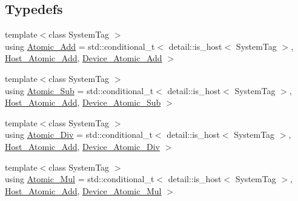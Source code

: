 \subsection*{Typedefs}
\begin{DoxyCompactItemize}
\item 
{\footnotesize template$<$class System\+Tag $>$ }\\using \hyperlink{namespacebc_1_1oper_acbaeedfea4454f26a03fa796f5695f1e}{Atomic\+\_\+\+Add} = std\+::conditional\+\_\+t$<$ detail\+::is\+\_\+host$<$ System\+Tag $>$, \hyperlink{structbc_1_1oper_1_1Host__Atomic__Add}{Host\+\_\+\+Atomic\+\_\+\+Add}, \hyperlink{structbc_1_1oper_1_1Device__Atomic__Add}{Device\+\_\+\+Atomic\+\_\+\+Add} $>$
\item 
{\footnotesize template$<$class System\+Tag $>$ }\\using \hyperlink{namespacebc_1_1oper_a2c653b5c683b56d4bc7766130831fa8a}{Atomic\+\_\+\+Sub} = std\+::conditional\+\_\+t$<$ detail\+::is\+\_\+host$<$ System\+Tag $>$, \hyperlink{structbc_1_1oper_1_1Host__Atomic__Add}{Host\+\_\+\+Atomic\+\_\+\+Add}, \hyperlink{structbc_1_1oper_1_1Device__Atomic__Sub}{Device\+\_\+\+Atomic\+\_\+\+Sub} $>$
\item 
{\footnotesize template$<$class System\+Tag $>$ }\\using \hyperlink{namespacebc_1_1oper_a771719f0c74d9cf102904d49dc4f238b}{Atomic\+\_\+\+Div} = std\+::conditional\+\_\+t$<$ detail\+::is\+\_\+host$<$ System\+Tag $>$, \hyperlink{structbc_1_1oper_1_1Host__Atomic__Add}{Host\+\_\+\+Atomic\+\_\+\+Add}, \hyperlink{structbc_1_1oper_1_1Device__Atomic__Div}{Device\+\_\+\+Atomic\+\_\+\+Div} $>$
\item 
{\footnotesize template$<$class System\+Tag $>$ }\\using \hyperlink{namespacebc_1_1oper_aff547ee764d8dc38221c93bca5f9f159}{Atomic\+\_\+\+Mul} = std\+::conditional\+\_\+t$<$ detail\+::is\+\_\+host$<$ System\+Tag $>$, \hyperlink{structbc_1_1oper_1_1Host__Atomic__Add}{Host\+\_\+\+Atomic\+\_\+\+Add}, \hyperlink{structbc_1_1oper_1_1Device__Atomic__Mul}{Device\+\_\+\+Atomic\+\_\+\+Mul} $>$
\end{DoxyCompactItemize}
